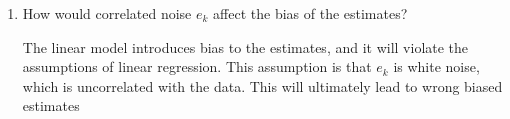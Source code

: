 \documentclass[12pt,a4paper, onecolumn]{exam}
\begin{document}
\begin{questions}
\begin{parts}
\begin{enumerate}
\begin{solution}
  \end{solution}
  \item How would correlated noise \(e_k\) affect the bias of the estimates? 
  \begin{solution}
    The linear model introduces bias to the estimates, and it will violate the assumptions of linear regression. This assumption is that $ e_k  $ is white noise, which is uncorrelated with the data. This will ultimately lead to wrong biased estimates 
  \end{solution}
\end{enumerate}


\end{parts}
\end{questions}
\end{document}
